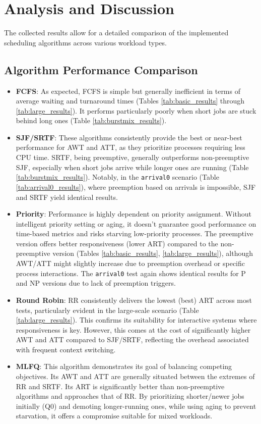 \documentclass[12pt]{article}
\begin{document}
\section{Analysis and Discussion}
The collected results allow for a detailed comparison of the implemented scheduling algorithms across various workload types.

\subsection{Algorithm Performance Comparison}
\begin{itemize}
    \item \textbf{FCFS}: As expected, FCFS is simple but generally inefficient in terms of average waiting and turnaround times (Tables \ref{tab:basic_results} through \ref{tab:large_results}). It performs particularly poorly when short jobs are stuck behind long ones (Table \ref{tab:burstmix_results}).
    \item \textbf{SJF/SRTF}: These algorithms consistently provide the best or near-best performance for AWT and ATT, as they prioritize processes requiring less CPU time. SRTF, being preemptive, generally outperforms non-preemptive SJF, especially when short jobs arrive while longer ones are running (Table \ref{tab:burstmix_results}). Notably, in the \texttt{arrival0} scenario (Table \ref{tab:arrival0_results}), where preemption based on arrivals is impossible, SJF and SRTF yield identical results.
    \item \textbf{Priority}: Performance is highly dependent on priority assignment. Without intelligent priority setting or aging, it doesn't guarantee good performance on time-based metrics and risks starving low-priority processes. The preemptive version offers better responsiveness (lower ART) compared to the non-preemptive version (Tables \ref{tab:basic_results}, \ref{tab:large_results}), although AWT/ATT might slightly increase due to preemption overhead or specific process interactions. The \texttt{arrival0} test again shows identical results for P and NP versions due to lack of preemption triggers.
    \item \textbf{Round Robin}: RR consistently delivers the lowest (best) ART across most tests, particularly evident in the large-scale scenario (Table \ref{tab:large_results}). This confirms its suitability for interactive systems where responsiveness is key. However, this comes at the cost of significantly higher AWT and ATT compared to SJF/SRTF, reflecting the overhead associated with frequent context switching.
    \item \textbf{MLFQ}: This algorithm demonstrates its goal of balancing competing objectives. Its AWT and ATT are generally situated between the extremes of RR and SRTF. Its ART is significantly better than non-preemptive algorithms and approaches that of RR. By prioritizing shorter/newer jobs initially (Q0) and demoting longer-running ones, while using aging to prevent starvation, it offers a compromise suitable for mixed workloads.
\end{itemize}
\end{document}
